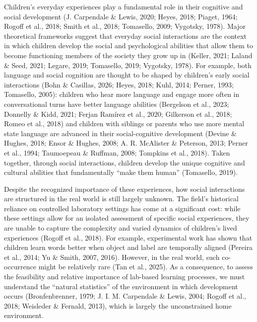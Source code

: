 \documentclass[
  english,
  12pt,
  man,floatsintext]{apa6}
\begin{document}
Children's everyday experiences play a fundamental role in their cognitive and social development (J. Carpendale \& Lewis, 2020; Heyes, 2018; Piaget, 1964; Rogoff et al., 2018; Smith et al., 2018; Tomasello, 2009; Vygotsky, 1978). Major theoretical frameworks suggest that everyday social interactions are the context in which children develop the social and psychological abilities that allow them to become functioning members of the society they grow up in (Keller, 2021; Laland \& Seed, 2021; Legare, 2019; Tomasello, 2019; Vygotsky, 1978). For example, both language and social cognition are thought to be shaped by children's early social interactions (Bohn \& Casillas, 2026; Heyes, 2018; Kuhl, 2014; Perner, 1993; Tomasello, 2005): children who hear more language and engage more often in conversational turns have better language abilities (Bergelson et al., 2023; Donnelly \& Kidd, 2021; Ferjan Ramírez et al., 2020; Gilkerson et al., 2018; Romeo et al., 2018) and children with siblings or parents who use more mental state language are advanced in their social-cognitive development (Devine \& Hughes, 2018; Ensor \& Hughes, 2008; A. R. McAlister \& Peterson, 2013; Perner et al., 1994; Taumoepeau \& Ruffman, 2008; Tompkins et al., 2018). Taken together, through social interactions, children develop the unique cognitive and cultural abilities that fundamentally ``make them human'' (Tomasello, 2019).

Despite the recognized importance of these experiences, how social interactions are structured in the real world is still largely unknown. The field's historical reliance on controlled laboratory settings has come at a significant cost: while these settings allow for an isolated assessment of specific social experiences, they are unable to capture the complexity and varied dynamics of children's lived experiences (Rogoff et al., 2018). For example, experimental work has shown that children learn words better when object and label are temporally aligned (Pereira et al., 2014; Yu \& Smith, 2007, 2016). However, in the real world, such co-occurrence might be relatively rare (Tan et al., 2025). As a consequence, to assess the feasibility and relative importance of lab-based learning processes, we must understand the ``natural statistics'' of the environment in which development occurs (Bronfenbrenner, 1979; J. I. M. Carpendale \& Lewis, 2004; Rogoff et al., 2018; Weisleder \& Fernald, 2013), which is largely the unconstrained home environment.
\end{document}
